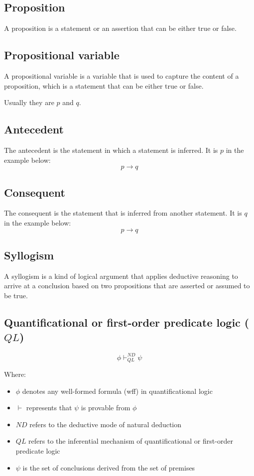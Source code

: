 \documentclass[11pt]{article}
\begin{document}
\subsection{Proposition}
\label{sec:org2f51d0d}
A proposition is a statement or an assertion that can be either true or false.
\subsection{Propositional variable}
\label{sec:orgbf0f0e4}
A propositional variable is a variable that is used to capture the content of a proposition, which is a statement that can be either true or false.

Usually they are \(p\) and \(q\).
\subsection{Antecedent}
\label{sec:org709f369}
The antecedent is the statement in which a statement is inferred. It is \(p\) in the example below:
\[p \rightarrow q\]
\subsection{Consequent}
\label{sec:orgedfb342}
The consequent is the statement that is inferred from another statement. It is \(q\) in the example below:
\[p \rightarrow q\]
\subsection{Syllogism}
\label{sec:orgfd869d4}
A syllogism is a kind of logical argument that applies deductive reasoning to arrive at a conclusion based on two propositions that are asserted or assumed to be true.
\subsection{Quantificational or first-order predicate logic (\(QL\))}
\label{sec:org838ba82}
\[\phi \vdash^{ND}_{QL} \psi\]

Where:
\begin{itemize}
\item \(\phi\) denotes any well-formed formula (wff) in quantificational logic
\item \(\vdash\) represents that \(\psi\) is provable from \(\phi\)
\item \(ND\) refers to the deductive mode of natural deduction
\item \(QL\) refers to the inferential mechanism of quantificational or first-order predicate logic
\item \(\psi\) is the set of conclusions derived from the set of premises
\end{itemize}
\end{document}
